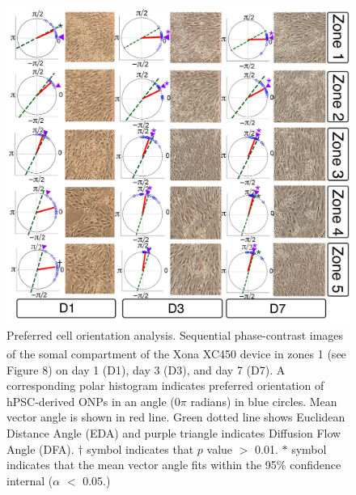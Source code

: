 \documentclass[review]{elsarticle}
\begin{document}
\begin{figure}
	\begin{center}
		\includegraphics[width=13cm]{Fig_9.jpg}
	\end{center}
	\caption{Preferred cell orientation analysis. Sequential phase-contrast images of the somal compartment of the Xona\textsuperscript{\texttrademark} XC450 device in zones 1 (see Figure 8) on day 1 (D1), day 3 (D3), and day 7 (D7). A corresponding polar histogram indicates preferred orientation of hPSC-derived ONPs in an angle (0$\pi$ radians) in blue circles. Mean vector angle is shown in red line. Green dotted line shows Euclidean Distance Angle (EDA) and purple triangle indicates Diffusion Flow Angle (DFA). $\dagger$ symbol indicates that $p$ value $>$ 0.01. $\ast$ symbol indicates that the mean vector angle fits within the 95\% confidence internal ($\alpha$ $<$ 0.05.)}
\end{figure}
\end{document}
